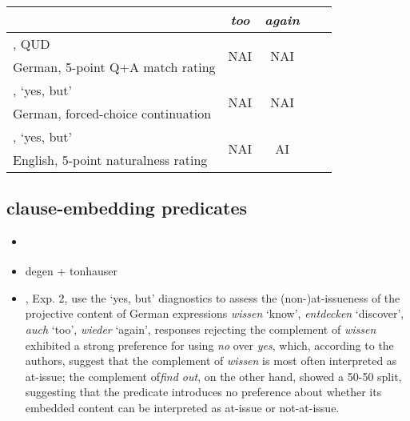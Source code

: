     \begin{tabular}{l c c c c}\toprule
            & \emph{too} 
              & \emph{again}
                        \\\midrule
        
        \citealt{chen_presuppositions_2024}, QUD
            & \multirow{2}{*}{NAI}
              & \multirow{2}{*}{NAI}
                        \\ 
        \scriptsize German, 5-point Q+A match rating  &  \\ \midrule

        \citealt{xue_correlation_2011}, `yes, but'
            & \multirow{2}{*}{NAI}
              & \multirow{2}{*}{NAI}
                        \\ 
        \scriptsize German, forced-choice continuation  &  \\ \midrule

        \citealt{cummins_backgrounding_2013}, `yes, but'
            & \multirow{2}{*}{NAI}
              & \multirow{2}{*}{AI}
                        \\ 
        \scriptsize English, 5-point naturalness rating   &  \\ \midrule

    \end{tabular}

  \subsection{clause-embedding predicates}
    \begin{itemize}
      \item \citealt{tonhauser_how_2018}
      \item degen + tonhauser

      \item \citealt{xue_correlation_2011}, Exp. 2, use the `yes, but' diagnostics to assess the (non-)at-issueness of the projective content of German expressions \emph{wissen} `know',  \emph{entdecken} `discover',  \emph{auch} `too',  \emph{wieder} `again',  responses rejecting the complement of \emph{wissen} exhibited a strong preference for using \emph{no} over \emph{yes}, which, according to the authors, suggest that the complement of \emph{wissen} is most often interpreted as at-issue; the complement of\emph{find out}, on the other hand, showed a 50-50 split, suggesting that the predicate introduces no preference about whether its embedded content can be interpreted as at-issue or not-at-issue.

    \end{itemize}

